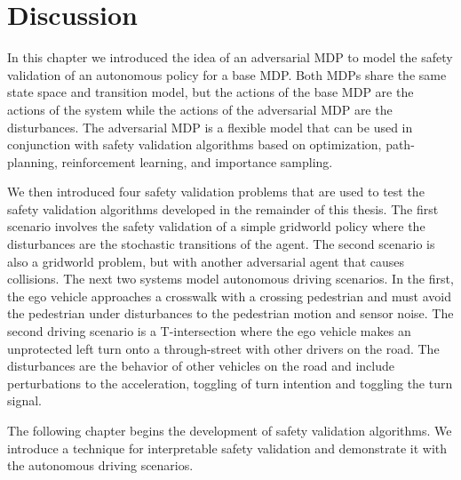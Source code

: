 \section{Discussion}

In this chapter we introduced the idea of an adversarial MDP to model the safety validation of an autonomous policy for a base MDP. Both MDPs share the same state space and transition model, but the actions of the base MDP are the actions of the system while the actions of the adversarial MDP are the disturbances. The adversarial MDP is a flexible model that can be used in conjunction with safety validation algorithms based on optimization, path-planning, reinforcement learning, and importance sampling.

We then introduced four safety validation problems that are used to test the safety validation algorithms developed in the remainder of this thesis. The first scenario involves the safety validation of a simple gridworld policy where the disturbances are the stochastic transitions of the agent. The second scenario is also a gridworld problem, but with another adversarial agent that causes collisions. The next two systems model autonomous driving scenarios. In the first, the ego vehicle approaches a crosswalk with a crossing pedestrian and must avoid the pedestrian under disturbances to the pedestrian motion and sensor noise. The second driving scenario is a T-intersection where the ego vehicle makes an unprotected left turn onto a through-street with other drivers on the road. The disturbances are the behavior of other vehicles on the road and include perturbations to the acceleration, toggling of turn intention and toggling the turn signal.

The following chapter begins the development of safety validation algorithms. We introduce a technique for interpretable safety validation and demonstrate it with the autonomous driving scenarios. 